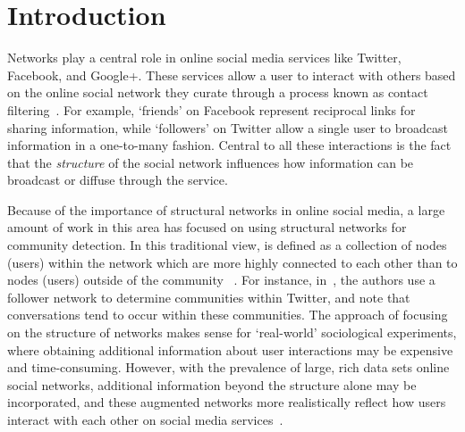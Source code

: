 \section{Introduction}

Networks play a central role in online social media services like Twitter, Facebook, and Google+. These services allow a user to interact with others based on the online social network they curate through a process known as contact filtering~\cite{cazabet2012automated}. For example, `friends' on Facebook represent reciprocal links for sharing information, while `followers' on Twitter allow a single user to broadcast information in a one-to-many fashion. Central to all these interactions is the fact that the \emph{structure} of the social network influences how information can be broadcast or diffuse through the service.

Because of the importance of structural networks in online social media, a large amount of work in this area has focused on using structural networks for community detection. In this traditional view, \DIFdelbegin {}\DIFdelend \DIFaddbegin {}\DIFaddend is defined as a collection of nodes (users) within the network which are more highly connected to each other than to nodes (users) outside of the community%
~\cite{girvan2002a, newman2004finding}. For instance, in~\cite{java2009we}, the authors use a follower network to determine communities within Twitter, and note that conversations tend to occur within these communities. The approach of focusing on the structure of networks makes sense for `real-world' sociological experiments, where obtaining additional information about user interactions may be expensive and time-consuming. However, with the prevalence of large, rich data sets \DIFdelbegin {}\DIFdelend \DIFaddbegin {}\DIFaddend online social networks, additional information beyond the structure alone may be incorporated, and these augmented networks more realistically reflect how users interact with each other on social media services~\DIFdelbegin {}\DIFdelend \DIFaddbegin {}\DIFaddend .

